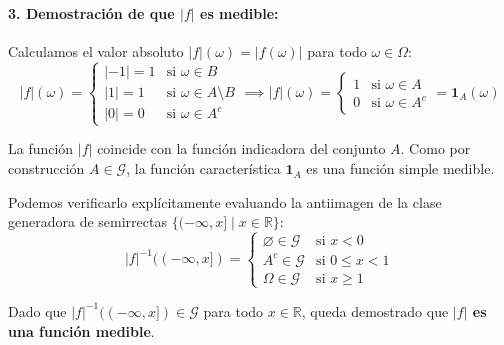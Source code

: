 \begin{problema}
\paragraph{3. Demostración de que $|f|$ es medible:}
Calculamos el valor absoluto $|f|(\omega) = |f(\omega)|$ para todo $\omega \in \Omega$:
\[
    |f|(\omega) = \begin{cases} |-1| = 1 & \text{si } \omega \in B \\ |1| = 1 & \text{si } \omega \in A \setminus B \\ |0| = 0 & \text{si } \omega \in A^c \end{cases} \implies |f|(\omega) = \begin{cases} 1 & \text{si } \omega \in A \\ 0 & \text{si } \omega \in A^c \end{cases} = \mathbf{1}_A(\omega)
\]

La función $|f|$ coincide con la función indicadora del conjunto $A$. Como por construcción $A \in \mathcal{G}$, la función característica $\mathbf{1}_A$ es una función simple medible.

Podemos verificarlo explícitamente evaluando la antiimagen de la clase generadora de semirrectas $\{(-\infty, x] \mid x \in \mathbb{R}\}$:
\[
    |f|^{-1}((-\infty, x]) = \begin{cases} 
        \varnothing \in \mathcal{G} & \text{si } x < 0 \\
        A^c \in \mathcal{G} & \text{si } 0 \le x < 1 \\
        \Omega \in \mathcal{G} & \text{si } x \ge 1 
    \end{cases}
\]

Dado que $|f|^{-1}((-\infty, x]) \in \mathcal{G}$ para todo $x \in \mathbb{R}$, queda demostrado que \textbf{$|f|$ es una función medible}.
\end{problema}

